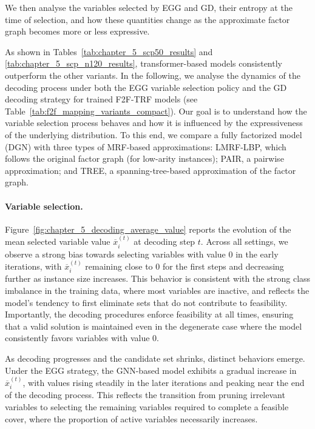 We then analyse the variables selected by EGG and GD, their entropy at the time of selection, and how these quantities change as the approximate factor graph becomes more or less expressive.

As shown in Tables~\ref{tab:chapter_5_scp50_results} and \ref{tab:chapter_5_scp_n120_results}, transformer-based models consistently outperform the other variants. In the following, we analyse the dynamics of the decoding process under both the EGG variable selection policy and the GD decoding strategy for trained F2F-TRF models (see Table~\ref{tab:f2f_mapping_variants_compact}). Our goal is to understand how the variable selection process behaves and how it is influenced by the expressiveness of the underlying distribution. To this end, we compare a fully factorized model (DGN) with three types of MRF-based approximations: LMRF-LBP, which follows the original factor graph (for low-arity instances); PAIR, a pairwise approximation; and TREE, a spanning-tree-based approximation of the factor graph.

\paragraph{Variable selection.}
Figure~\ref{fig:chapter_5_decoding_average_value} reports the evolution of the mean selected variable value $\overline{x}_i^{(t)}$ at decoding step $t$. Across all settings, we observe a strong bias towards selecting variables with value $0$ in the early iterations, with $\overline{x}_i^{(t)}$ remaining close to $0$ for the first steps and decreasing further as instance size increases. This behavior is consistent with the strong class imbalance in the training data, where most variables are inactive, and reflects the model's tendency to first eliminate sets that do not contribute to feasibility. Importantly, the decoding procedures enforce feasibility at all times, ensuring that a valid solution is maintained even in the degenerate case where the model consistently favors variables with value $0$.

As decoding progresses and the candidate set shrinks, distinct behaviors emerge. Under the EGG strategy, the GNN-based model exhibits a gradual increase in $\overline{x}_i^{(t)}$, with values rising steadily in the later iterations and peaking near the end of the decoding process. This reflects the transition from pruning irrelevant variables to selecting the remaining variables required to complete a feasible cover, where the proportion of active variables necessarily increases.

